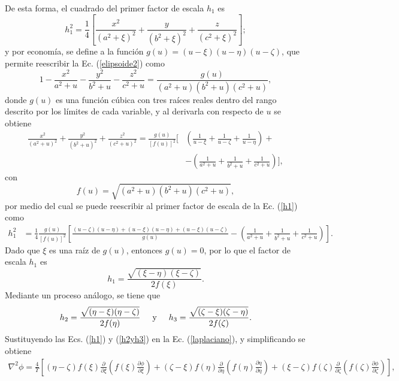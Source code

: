 De esta forma, el cuadrado del primer factor de escala $h_1$ es
\begin{equation}
	h_1^2=\frac{1}{4}\left[\frac{x^2}{(a^2+\xi)^2}+\frac{y}{(b^2+\xi)^2}+\frac{z}{(c^2+\xi)^2}\right];
	\label{h1}
\end{equation}
y por economía, se define a la función $g(u)=(u-\xi)(u-\eta)(u-\zeta)$, que permite reescribir la Ec. (\ref{elipsoide2}) como
\begin{equation}
	1-\frac{x^2}{a^2+u}-\frac{y^2}{b^2+u}-\frac{z^2}{c^2+u}=\frac{g(u)}{(a^2+u)(b^2+u)(c^2+u)},
\end{equation}
donde $g(u)$ es una función cúbica con tres raíces reales dentro del rango descrito por los límites de cada variable, y al  derivarla con respecto de $u$ se obtiene
\begin{align}
	\frac{x^2}{(a^2+u)^2}+\frac{y^2}{(b^2+u)^2}+\frac{z^2}{(c^2+u)^2}=\frac{g(u)}{[f(u)]^2}\Biggl[&\left(\frac{1}{u-\xi}+\frac{1}{u-\zeta}+\frac{1}{u-\eta}\right)+\nonumber\\
	&-\left(\frac{1}{a^2+u}+\frac{1}{b^2+u}+\frac{1}{c^2+u}\right)\Biggl],
\end{align}
con 
\begin{equation}
	f(u)=\sqrt{(a^2+u)(b^2+u)(c^2+u)},  
\end{equation}
por medio del cual se puede reescribir al primer factor de escala de la Ec. (\ref{h1}) como
\begin{align*}
	h_1^2&=\frac{1}{4}\frac{g(u)}{[f(u)]^2}\left[\frac{(u-\zeta)(u-\eta)+(u-\xi)(u-\eta)+(u-\xi)(u-\zeta)}{g(u)}-\left(\frac{1}{a^2+u}+\frac{1}{b^2+u}+\frac{1}{c^2+u}\right)\right].    
\end{align*}
Dado que $\xi$ es una raíz de $g(u)$, entonces $g(u)=0$, por lo que el factor de escala $h_1$ es
\begin{equation}
	h_1=\frac{\sqrt{(\xi-\eta)(\xi-\zeta)}}{2f(\xi)}.
	\label{h1_1}
\end{equation}
Mediante un proceso análogo, se tiene que \cite{Arfken}
\begin{equation}
	h_2=\frac{\sqrt{(\eta-\xi)(\eta-\zeta)}}{2f(\eta)}\hspace{0.5cm}\mbox{y}\hspace{0.5cm}
	h_3=\frac{\sqrt{(\zeta-\xi)(\zeta-\eta)}}{2f(\zeta)}.
	\label{h2yh3}
\end{equation}
Sustituyendo las Ecs. (\ref{h1}) y (\ref{h2yh3}) en la Ec. (\ref{laplaciano}), y simplificando se obtiene
\begin{align*}
	\nabla^2\phi=\frac{4}{\Upsilon}\left[(\eta-\zeta)f(\xi)\frac{\partial}{\partial\xi}\left(f(\xi)\frac{\partial\phi}{\partial\xi}\right)+(\zeta-\xi)f(\eta)\frac{\partial}{\partial\eta}\left(f(\eta)\frac{\partial\eta}{\partial\eta}\right)+(\xi-\zeta)f(\zeta)\frac{\partial}{\partial\zeta}\left(f(\zeta)\frac{\partial\phi}{\partial\zeta}\right)\right],
\end{align*}
